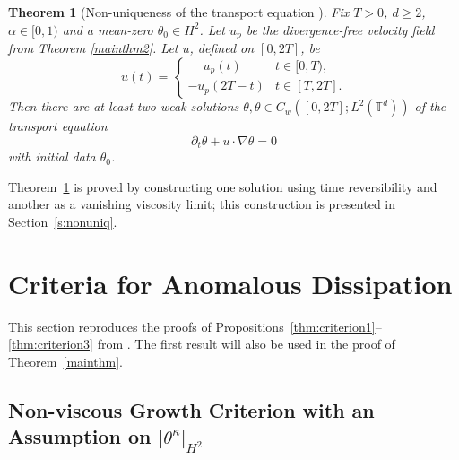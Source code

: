 \documentclass[12pt]{report}   %
\renewcommand{\geq}{\geqslant}
\newcommand{\grad}{\nabla}
\numberwithin{equation}{section}
\theoremstyle{plain}
\newtheorem{theorem}{Theorem}
\theoremstyle{definition}
\theoremstyle{remark}
\begin{document}
\begin{theorem}[Non-uniqueness of the transport equation {\cite[Theorem~1.3]{DrivasElgindiEA22}}]\label{nonuniq}
 Fix $T>0$, $d\geq 2$, $\alpha \in [0,1)$ and a mean-zero $\theta_0\in H^2$. Let $u_p$  %
  be the divergence-free velocity field from Theorem \ref{mainthm2}.  Let $u$, defined on $[0,2T]$, be
  \begin{equation*}%
  u(t) = 
  \begin{cases} \phantom{-}u_p(t) & t\in [0,T),\\
  -u_p(2T-t) & t\in [T,2T].
  \end{cases}
  \end{equation*}
  Then there are at least two weak solutions $\theta, \bar{\theta}\in C_w([0,2T];L^2(\mathbb{T}^d))$ of the transport equation
  \begin{equation}\label{inveqn}
    \partial_t \theta + u \cdot \grad \theta = 0
  \end{equation}
  with initial data $\theta_0$.
\end{theorem}
Theorem~\ref{nonuniq} is proved by constructing one solution using time reversibility and another as a vanishing viscosity limit; this construction is presented in Section~\ref{s:nonuniq}.

\section{Criteria for Anomalous Dissipation}\label{sec:inv}

This section reproduces the proofs of Propositions~\ref{thm:criterion1}--\ref{thm:criterion3} from \cite{DrivasElgindiEA22}.
The first result will also be used in the proof of Theorem~\ref{mainthm}.


\subsection{Non-viscous Growth Criterion with an Assumption on \texorpdfstring{$|\theta^\kappa|_{H^2}$}{the H2 Norm}}
\end{document}
